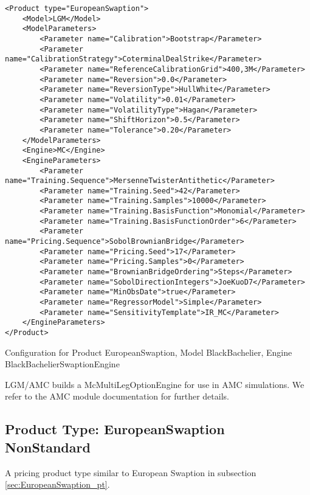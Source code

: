 \begin{longlisting}
\begin{verbatim}
<Product type="EuropeanSwaption">
    <Model>LGM</Model>
    <ModelParameters>
        <Parameter name="Calibration">Bootstrap</Parameter>
        <Parameter name="CalibrationStrategy">CoterminalDealStrike</Parameter>
        <Parameter name="ReferenceCalibrationGrid">400,3M</Parameter>
        <Parameter name="Reversion">0.0</Parameter>
        <Parameter name="ReversionType">HullWhite</Parameter>
        <Parameter name="Volatility">0.01</Parameter>
        <Parameter name="VolatilityType">Hagan</Parameter>
        <Parameter name="ShiftHorizon">0.5</Parameter>
        <Parameter name="Tolerance">0.20</Parameter>
    </ModelParameters>
    <Engine>MC</Engine>
    <EngineParameters>
        <Parameter name="Training.Sequence">MersenneTwisterAntithetic</Parameter>
        <Parameter name="Training.Seed">42</Parameter>
        <Parameter name="Training.Samples">10000</Parameter>
        <Parameter name="Training.BasisFunction">Monomial</Parameter>
        <Parameter name="Training.BasisFunctionOrder">6</Parameter>
        <Parameter name="Pricing.Sequence">SobolBrownianBridge</Parameter>
        <Parameter name="Pricing.Seed">17</Parameter>
        <Parameter name="Pricing.Samples">0</Parameter>
        <Parameter name="BrownianBridgeOrdering">Steps</Parameter>
        <Parameter name="SobolDirectionIntegers">JoeKuoD7</Parameter>
        <Parameter name="MinObsDate">true</Parameter>
        <Parameter name="RegressorModel">Simple</Parameter>
        <Parameter name="SensitivityTemplate">IR_MC</Parameter>
    </EngineParameters>
</Product>
\end{verbatim}
\caption{Configuration for Product EuropeanSwaption, Model BlackBachelier, Engine BlackBachelierSwaptionEngine}
\label{lst:peconfig_EuropeanSwaption_LGM_MC}
\end{longlisting}

LGM/AMC builds a McMultiLegOptionEngine for use in AMC simulations. We refer to the AMC module documentation for further
details.

\subsection{Product Type: EuropeanSwaption NonStandard}

\label{sec:EuropeanSwaption_ns_pt}
A pricing product type similar to European Swaption in subsection \ref{sec:EuropeanSwaption_pt}.

